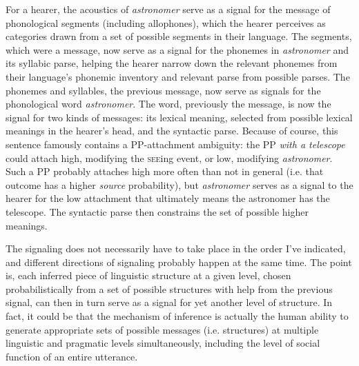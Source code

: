 \documentclass[12pt]{article}
\begin{document}
\noindent For a hearer, the acoustics of \textsl{astronomer} serve as a signal for the message of phonological segments (including allophones), which the hearer perceives as categories drawn from a set of possible segments in their language. The segments, which were a message, now serve as a signal for the phonemes in \textsl{astronomer} and its syllabic parse, helping the hearer narrow down the relevant phonemes from their language's phonemic inventory and relevant parse from possible parses. The phonemes and syllables, the previous message, now serve as signals for the phonological word \textsl{astronomer}. The word, previously the message, is now the signal for two kinds of messages: its lexical meaning, selected from possible lexical meanings in the hearer's head, and the syntactic parse. Because of course, this sentence famously contains a PP-attachment ambiguity: the PP \textsl{with a telescope} could attach high, modifying the \textsc{see}ing event, or low, modifying \textsl{astronomer}. Such a PP probably attaches high more often than not in general (i.e. that outcome has a higher \textsl{source} probability), but \textsl{astronomer} serves as a signal to the hearer for the low attachment that ultimately means the astronomer has the telescope. The syntactic parse then constrains the set of possible higher meanings.

The signaling does not necessarily have to take place in the order I've indicated, and different directions of signaling probably happen at the same time. The point is, each inferred piece of linguistic structure at a given level, chosen probabilistically from a set of possible structures with help from the previous signal, can then in turn serve as a signal for yet another level of structure. In fact, it could be that the mechanism of inference is actually the human ability to generate appropriate sets of possible messages (i.e. structures) at multiple linguistic and pragmatic levels simultaneously, including the level of social function of an entire utterance. 
\end{document}
